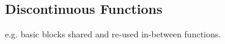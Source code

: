 
\subsection{Discontinuous Functions}

e.g. basic blocks shared and re-used in-between functions.

%
%
